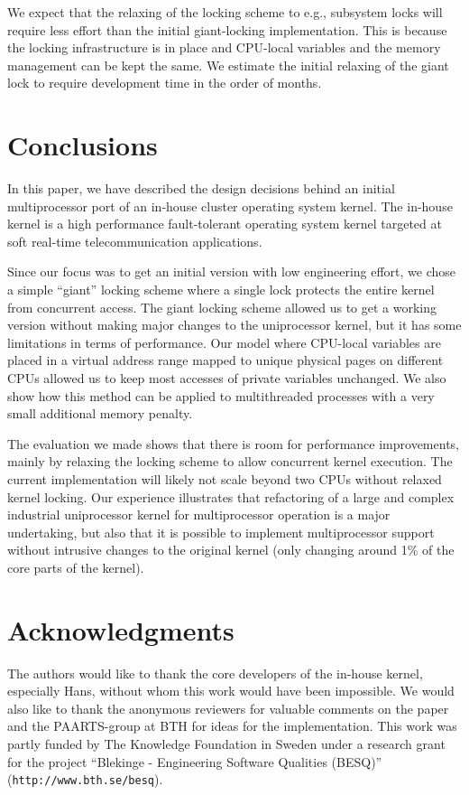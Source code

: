 We expect that the relaxing of the locking scheme to e.g., subsystem locks
will require less effort than the initial giant-locking implementation. This
is because the locking infrastructure is in place and CPU-local variables and
the memory management can be kept the same. We estimate the initial relaxing
of the giant lock to require development time in the order of months.

\section{Conclusions}
\label{sec:conclusions}
In this paper, we have described the design decisions behind an initial
multiprocessor port of an in-house cluster operating system kernel. The
in-house kernel is a high performance fault-tolerant operating system kernel
targeted at soft real-time telecommunication applications.

Since our focus was to get an initial version with low engineering effort, we
chose a simple ``giant'' locking scheme where a single lock protects the
entire kernel from concurrent access. The giant locking scheme allowed us to
get a working version without making major changes to the uniprocessor kernel,
but it has some limitations in terms of performance.  Our model where
CPU-local variables are placed in a virtual address range mapped to unique
physical pages on different CPUs allowed us to keep most accesses of private
variables unchanged. We also show how this method can be applied to
multithreaded processes with a very small additional memory penalty.

The evaluation we made shows that there is room for performance improvements,
mainly by relaxing the locking scheme to allow concurrent kernel execution.
The current implementation will likely not scale beyond two CPUs without
relaxed kernel locking. Our experience illustrates that refactoring of a large
and complex industrial uniprocessor kernel for multiprocessor operation is a
major undertaking, but also that it is possible to implement multiprocessor
support without intrusive changes to the original kernel (only changing around
1\% of the core parts of the kernel).

\section*{Acknowledgments}
The authors would like to thank the core developers of the in-house kernel,
especially Hans, without whom this work would have been impossible. We would
also like to thank the anonymous reviewers for valuable comments on the paper
and the PAARTS-group at BTH for ideas for the implementation. This work was
partly funded by The Knowledge Foundation in Sweden under a research grant for
the project ``Blekinge - Engineering Software Qualities (BESQ)''
(\texttt{http://www.bth.se/\-besq}).
